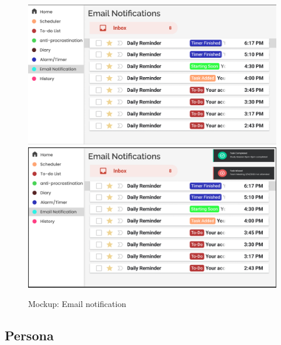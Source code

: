 \documentclass[a4paper]{article}
\begin{document}
\begin{figure}[H] %
	\centering %
	\includegraphics[width=1\textwidth]{./images/Mockup_Email_normal.png}
	\includegraphics[width=1\textwidth]{./images/Mockup_Email.png} %
	\caption*{Mockup: Email notification} %
	\label{Fig.Email} %
\end{figure}

\subsection{Persona}
\end{document}
